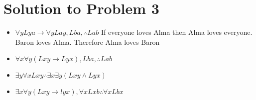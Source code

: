 \documentclass[12pt]{article}
\begin{document}
\section*{Solution to Problem 3}

\begin{itemize}
    \item $\forall y Lya \rightarrow \forall y Lay, Lba, \therefore Lab$
    If everyone loves Alma then Alma loves everyone. Baron loves Alma. Therefore Alma loves Baron
    \item $\forall x \forall y (Lxy \rightarrow Lyx), Lba, \therefore Lab$
    \item $\exists y \forall x Lxy \therefore \exists x \exists y(Lxy \land Lyx)$
    \item $\exists x \forall y (Lxy \rightarrow lyx), \forall x Lxb \therefore \forall x Lbx$
\end{itemize}
\end{document}
